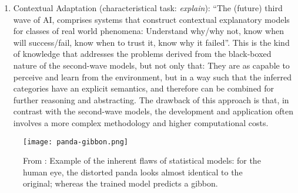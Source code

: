 \begin{enumerate}
\item Contextual Adaptation (characteristical task: {\it explain}): ``The (future) third wave of AI, comprises systems that construct contextual explanatory models for classes of real world phenomena: Understand why/why not, know when will success/fail, know when to trust it, know why it failed''. This is the kind of knowledge that addresses the problems derived from the black-boxed nature of the second-wave models, but not only that: They are as capable to perceive and learn from the environment, but in a way such that the inferred categories have an explicit semantics, and therefore can be combined for further reasoning and abstracting. The drawback of this approach is that, in contrast with the second-wave models, the development and application often involves a more complex methodology and higher computational costs.
\end{enumerate}

\begin{figure}[h]
  \centering
  \texttt{[image: panda-gibbon.png]}
  \caption{From \cite{darpa-slides}: Example of the inherent flaws of statistical models: for the human eye, the distorted panda looks almost identical to the original; whereas the trained model predicts a gibbon.}
  \label{fig:panda}
\end{figure}




